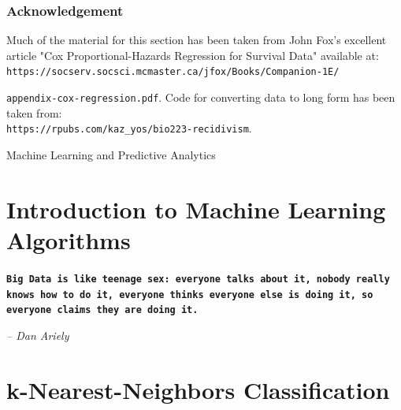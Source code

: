 \documentclass[11pt, letterpaper, twoside]{memoir}\usepackage{knitr}
\makeatletter
\newcommand{\chapterendsymbol}{
    \vspace{24pt}
    \Huge
    \hrulefill \hspace{0.1in} \hspace{0.1in} \hrulefill
    \normalsize
    }
\renewcommand\part{%
  \if@openright
    \cleardoublepage
  \else
    \clearpage
  \fi
  \thispagestyle{empty}
  \null\vfil
  \secdef\@part\@spart
  }
\makeatother
\begin{document}
\subsection{Acknowledgement}

Much of the material for this section has been taken from John Fox's excellent article "Cox Proportional-Hazards Regression for Survival Data" available at:\\ 
\small
\verb|https://socserv.socsci.mcmaster.ca/jfox/Books/Companion-1E/| 

\verb|appendix-cox-regression.pdf|. 
\normalsize
Code for converting data to long form has been taken from: \\ \verb|https://rpubs.com/kaz_yos/bio223-recidivism|. 

\chapterendsymbol




\part{Machine Learning and Predictive Analytics}




\chapter{Introduction to Machine Learning Algorithms}


\begin{flushright}

\textbf{\texttt{Big Data is like teenage sex: everyone talks about it, nobody really knows how to do it, everyone thinks everyone else is doing it, so everyone claims they are doing it.}}

\emph{-- Dan Ariely}

\end{flushright}

\vspace{12pt}

\chapterendsymbol





\chapter{k-Nearest-Neighbors Classification}
\end{document}
